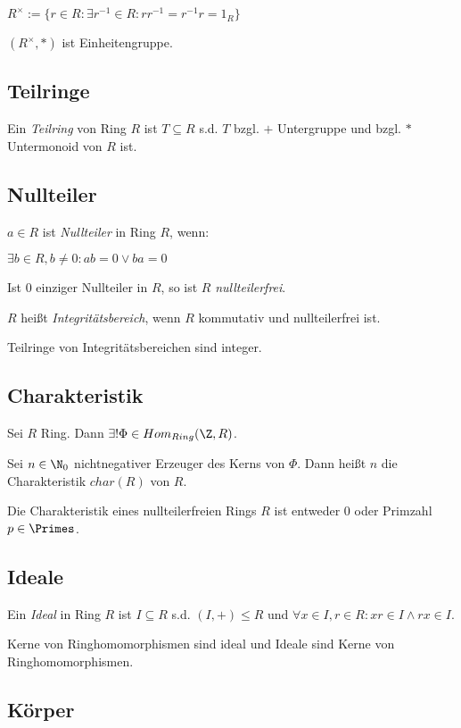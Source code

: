 $R^\times := \{ r \in R : \exists r^{-1} \in R : r r^{-1} = r^{-1} r = 1_R \}$

$(R^\times, *)$ ist Einheitengruppe.

\subsection*{Teilringe}

Ein \emph{Teilring} von Ring $R$ ist $T \subseteq R$ s.d. $T$ bzgl. $+$ Untergruppe und bzgl. $*$ Untermonoid von $R$ ist.

\subsection*{Nullteiler}

$a \in R$ ist \emph{Nullteiler} in Ring $R$, wenn:

$\exists b \in R, b \neq 0 : ab = 0 \lor ba = 0$

Ist $0$ einziger Nullteiler in $R$, so ist $R$ \emph{nullteilerfrei}.

$R$ heißt \emph{Integritätsbereich}, wenn $R$ kommutativ und nullteilerfrei ist.

Teilringe von Integritätsbereichen sind integer.

\subsection*{Charakteristik}

Sei $R$ Ring. Dann $\exists! \Phi \in Hom_{Ring}(\Z,R)$.

Sei $n \in \N_0$ nichtnegativer Erzeuger des Kerns von $\Phi$. Dann heißt $n$ die Charakteristik $char(R)$ von $R$.

Die Charakteristik eines nullteilerfreien Rings $R$ ist entweder $0$ oder Primzahl $p \in \Primes$.

\subsection*{Ideale}

Ein \emph{Ideal} in Ring $R$ ist $I \subseteq R$ s.d. $(I,+) \leq R$ und $\forall x \in I, r \in R : xr \in I \land rx \in I$.

Kerne von Ringhomomorphismen sind ideal und Ideale sind Kerne von Ringhomomorphismen.

\subsection*{Körper}

